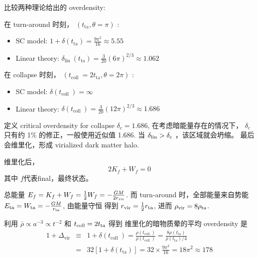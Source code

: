 \documentclass[12pt]{ctexart}
\begin{document}
比较两种理论给出的 overdensity:

在 turn-around 时刻，
$\left(t_{\mathrm{ta}} , \theta=\pi\right)$ :
\begin{itemize}
    \item $\mathrm{SC}$ model: $1+\delta\left(t_{\mathrm{ta}}\right)=\frac{9 \pi^{2}}{16} \approx 5.55$
    \item Linear theory: $\delta_{\text {lin }}\left(t_{\mathrm{ta}}\right)=\frac{3}{20}(6 \pi)^{2 / 3} \approx 1.062$
\end{itemize}


在 collapse 时刻，
$\left(t_{\text {coll }}=2 t_{\mathrm{ta}}  , \theta=2\pi\right)$ :
\begin{itemize}
    \item SC model: $\delta\left(t_{\text {coll }}\right)=\infty$
    \item Linear theory: $\delta\left(t_{\text {coll }}\right)=\frac{3}{20}(12 \pi)^{2 / 3} \approx 1.686$
\end{itemize}



定义 critical overdensity for collapse $\delta_c = 1.686$, 在考虑暗能量存在的情况下， $\delta_c$ 只有约 1\% 的修正，一般使用近似值 1.686.
当 $\delta_{\rm{lin}} > \delta_c$ ，该区域就会坍缩。
最后会维里化，形成 virialized dark matter halo.



维里化后， 
\begin{equation}
    2K_f + W_f = 0
\end{equation}
其中 $f$代表final，最终状态。

总能量 $E_f = K_f + W_f = \frac{1}{2} W_f = -\frac{GM}{2 r _{\rm{vir}} }$.
而 turn-around 时，全部能量来自势能 $E _{\rm{ta}} = W _{\rm{ta}} =-\frac{GM}{r _{\rm{ta}} }$,
由能量守恒 得到 $r _{\rm{vir}} =\frac{1}{2} r _{\rm{ta}} $,
进而
$\rho _{\rm{vir}} = 8 \rho _{\rm{ta}} $.

利用 $\bar{\rho} \propto a^{-3} \propto t^{-2}$ 和
$t _{\rm{coll}} = 2 t _{\rm{ta}} $
得到
维里化的暗物质晕的平均 overdensity 是
\begin{eqnarray}
        1+\Delta_{\mathrm{vir}} &\equiv& 1+\delta\left(t_{\text {coll }}\right)=\frac{\rho\left(t_{\text {coll }}\right)}{\bar{\rho}\left(t_{\text {coll }}\right)}=  \frac{8 \rho\left(t_{\mathrm{ta}}\right)}{\bar{\rho}\left(t_{\mathrm{ta}}\right) / 4} \\ 
        &=& 32\left[1+\delta\left(t_{\mathrm{ta}}\right)\right]=32 \times \frac{9 \pi^{2}}{16} = 18\pi^2 \approx 178
\end{eqnarray}
\end{document}
